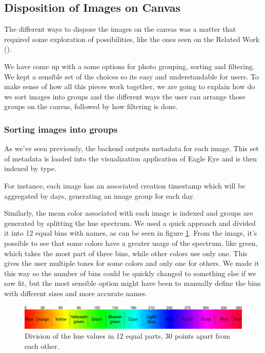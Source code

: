 \subsection{Disposition of Images on Canvas}
\label{sub:dispositions}

The different ways to dispose the images on the canvas was a matter that required some exploration of possibilities, like the ones seen on the Related Work (\cite{Bederson:2001:PZI:502348.502359,Bruls:2000p3517,Chen:1998p2344,Girgensohn:2010,Heesch:2004p2675,Hsu:2009p2696,Porta:2006p416,Rodden:2001p731,Schaefer:2010p1871,Strong:2009p413}).

We have come up with a some options for photo grouping, sorting and filtering. We kept a sensible set of the choices so its easy and understandable for users. 
To make sense of how all this pieces work together, we are going to explain how do we sort images into groups and the different ways the user can arrange those groups on the canvas, followed by how filtering is done.


\subsubsection{Sorting images into groups}

As we've seen previously, the backend outputs metadata for each image. This set of metadata is loaded into the visualization application of Eagle Eye and is then indexed by type.

For instance, each image has an associated creation timestamp which will be aggregated by days, generating an image group for each day.

Similarly, the mean color associated with each image is indexed and groups are generated by splitting the hue spectrum. We used a quick approach and divided it into 12 equal bins with names, as can be seen in figure \ref{fig:colorbins}. From the image, it's possible to see that some colors have a greater usage of the spectrum, like green, which takes the most part of three bins, while other colors use only one. This gives the user multiple tones for some colors and only one for others. We made it this way so the number of bins could be quickly changed to something else if we saw fit, but the most sensible option might have been to manually define the bins with different sizes and more accurate names.

\begin{figure}[htbp]
	\centering
		\includegraphics[width=\linewidth]{Figures/colorbins}
	\caption{Division of the hue values in 12 equal parts, 30 points apart from each other.}
	\label{fig:colorbins}
\end{figure}

